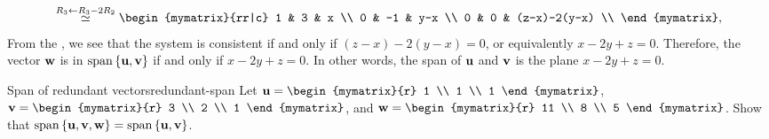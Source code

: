 \begin{solution}
\begin{equation*}
    \stackrel{R_3\leftarrow R_3-2R_2}{\roweq}
    \begin{mymatrix}{rr|c}
      1 & 3 & x \\
      0 & -1 & y-x \\
      0 & 0 & (z-x)-2(y-x) \\
    \end{mymatrix},
  \end{equation*}
  From the {\ef}, we see that the system is consistent if and only if
  $(z-x)-2(y-x)=0$, or equivalently $x - 2y + z = 0$. Therefore, the
  vector $\vect{w}$ is in $\sspan\set{\vect{u},\vect{v}}$ if and only
  if $x - 2y + z = 0$. In other words, the span of $\vect{u}$ and
  $\vect{v}$ is the plane $x - 2y + z = 0$.
\end{solution}

\begin{example}{Span of redundant vectors}{redundant-span}
  Let $\vect{u}=\begin{mymatrix}{r} 1 \\ 1 \\ 1 \end{mymatrix}$,
  $\vect{v}=\begin{mymatrix}{r} 3 \\ 2 \\ 1 \end{mymatrix}$, and
  $\vect{w}=\begin{mymatrix}{r} 11 \\ 8 \\ 5 \end{mymatrix}$.
  Show that
  $\sspan\set{\vect{u},\vect{v},\vect{w}} =
  \sspan\set{\vect{u},\vect{v}}$.
\end{example}

